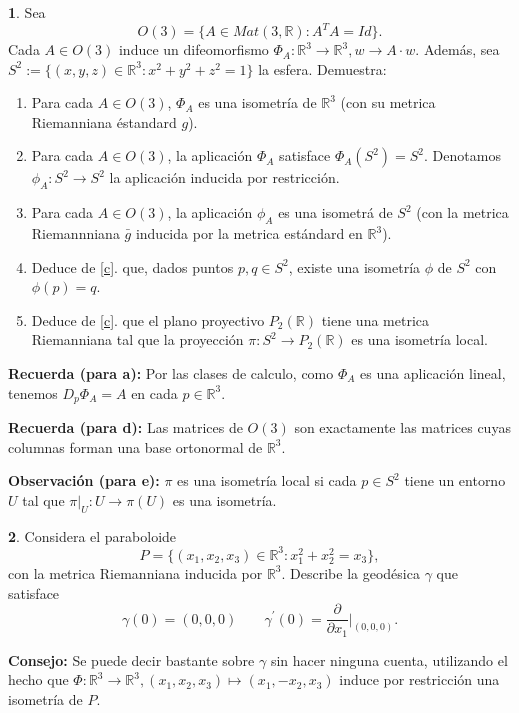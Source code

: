 \documentclass[12pt,a4paper]{report}
\theoremstyle{definition}
\newtheorem{ex}{}
\newcommand{\pd}[1]{\frac{\partial}{\partial #1}} %
\newcommand{\RR}{\ensuremath{\mathbb R}}
\begin{document}
\newpage
\begin{ex} 
Sea $$O(3)=\{A\in Mat(3,\RR):A^TA=Id\}.$$ Cada $A\in O(3)$ induce un difeomorfismo $\Phi_A \colon \RR^3 \to \RR^3, w \to A\cdot w$.
Adem\'as, 
sea $S^2:=\{(x,y,z)\in \RR^3:x^2+y^2+z^2=1\}$ la esfera. Demuestra:

\begin{enumerate}
\item Para cada $A\in O(3)$, $\Phi_A$ es una isometr\'ia de $\RR^3$ (con su metrica Riemanniana \'estandard $g$).
\item Para cada $A\in O(3)$, la aplicaci\'on $\Phi_A$ satisface $\Phi_A(S^2)=S^2$. Denotamos $\phi_A \colon S^2 \to S^2$ la aplicaci\'on inducida por restricci\'on.
\item\label{c} Para cada $A\in O(3)$, la aplicaci\'on $\phi_A$ es una isometr\'a de $S^2$ (con la metrica Riemannniana $\bar{g}$ inducida por la metrica est\'andard en $\RR^3$).
\item Deduce de \ref{c}. que, dados puntos $p,q\in S^2$, existe una isometr\'ia $\phi$ de $S^2$ con $\phi(p)=q$.
\item Deduce de \ref{c}. que el plano proyectivo $P_2(\RR)$ tiene una metrica Riemanniana tal que la proyecci\'on $\pi \colon S^2 \to P_2(\RR)$ es una isometr\'ia local.
\end{enumerate}

\noindent\textbf{Recuerda (para a):} Por las clases de calculo, como $\Phi_A$ es una aplicaci\'on lineal, tenemos $D_p \Phi_A=A$ en cada $p\in \RR^3$. 

\noindent\textbf{Recuerda (para d):} Las matrices de $O(3)$ son exactamente las matrices cuyas columnas forman una base ortonormal de $\RR^3$.

\noindent\textbf{Observaci\'on (para e):} $\pi$ es una    isometr\'ia local si  cada $p\in S^2$ tiene un entorno $U$ tal que $\pi|_U \colon U \to \pi(U)$ es una isometr\'ia.
\end{ex}

\begin{ex}
Considera el paraboloide $$P=\{(x_1,x_2,x_3)\in \RR^3:x_1^2+x_2^2=x_3\},$$ con la metrica Riemanniana inducida por $\RR^3$. Describe  la geod\'esica $\gamma$ que satisface $$\gamma(0)=(0,0,0)\;\;\;\;\;\;\;{\gamma}^{\prime}(0)=\pd{x_1}|_{(0,0,0)}.$$

\noindent\textbf{Consejo:} Se puede decir bastante sobre $\gamma$ sin hacer ninguna cuenta, utilizando el hecho que $\Phi \colon \RR^3 \to \RR^3, (x_1,x_2,x_3) \mapsto (x_1,-x_2,x_3)$ induce por restricci\'on  una isometr\'ia de $P$.
\end{ex} 
 


 
  
\end{document}
